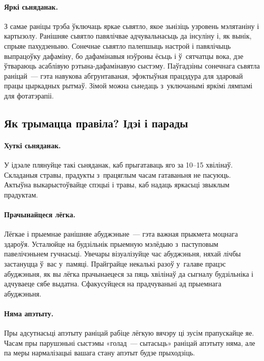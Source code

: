 
\paragraph{Яркі сьняданак.}
З самае раніцы трэба ўключаць яркае сьвятло, якое зьнізіць узровень мэлятаніну і картызолу. Ранішняе сьвятло павялічвае адчувальнасьць да інсуліну і, як вынік, спрыяе пахудзеньню. Сонечнае сьвятло палепшыць настрой і павялічыць выпрацоўку дафаміну, бо дафамінавыя нэўроны ёсьць і ў~сятчатцы вока, дзе ўтвараюць асаблівую рэтына-дафамінавую сыстэму. Паўгадзіны сонечнага сьвятла раніцай~--- гэта навукова абгрунтаваная, эфэктыўная працэдура для здаровай працы цыркадных рытмаў. Зімой можна сьнедаць з~уключанымі яркімі лямпамі для фотатэрапіі.

\subsection{Як трымацца правіла? Ідэі і парады}

\paragraph{Хуткі сьняданак.}
У ідэале плянуйце такі сьняданак, каб прыгатаваць яго за 10--15 хвілінаў. Складаныя стравы, прадукты з~працяглым часам гатаваньня не пасуюць. Актыўна выкарыстоўвайце спэцыі і травы, каб надаць яркасьці звыклым прадуктам.

\paragraph{Прачынайцеся лёгка.}
Лёгкае і прыемнае ранішняе абуджэньне~--- гэта важная прыкмета моцнага здароўя. Усталюйце на будзільнік прыемную мэлёдыю з~паступовым павелічэньнем гучнасьці. Увечары візуалізуйце час абуджэньня, няхай лічбы застануцца ў~вас у~памяці. Прайграйце некалькі разоў у~галаве працэс абуджэньня, як вы лёгка прачынаецеся за пяць хвілінаў да сыгналу будзільніка і адчуваеце сябе выдатна. Сфакусуйцеся на прадчуваньні ад прыемнага абуджэньня.

\paragraph{Няма апэтыту.}
Пры адсутнасьці апэтыту раніцай рабіце лёгкую вячэру ці зусім прапускайце яе. Часам пры парушэньні сыстэмы «голад~--- сытасьць» раніцай апэтыту няма, але па меры нармалізацыі вашага стану апэтыт будзе прыходзіць.

